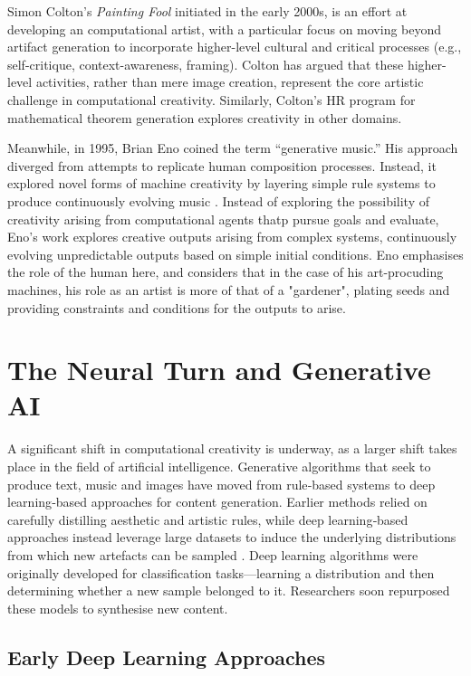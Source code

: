 Simon Colton’s \emph{Painting Fool} \cite{Colton2012-jc, Colton2015-qr} initiated in the early 2000s, is an effort at developing an computational artist, with a particular focus on moving beyond artifact generation to incorporate higher-level cultural and critical processes (e.g., self-critique, context-awareness, framing). Colton has argued that these higher-level activities, rather than mere image creation, represent the core artistic challenge in computational creativity. Similarly, Colton’s HR program for mathematical theorem generation \cite{Colton2002-nx} explores creativity in other domains.

Meanwhile, in 1995, Brian Eno coined the term “generative music.” His approach diverged from attempts to replicate human composition processes. Instead, it explored novel forms of machine creativity by layering simple rule systems to produce continuously evolving music \cite{Eno2020-ip, Brian1996-tj}. Instead of exploring the possibility of creativity arising from computational agents thatp pursue goals and evaluate, Eno's work explores creative outputs arising from complex systems, continuously evolving unpredictable outputs based on simple initial conditions. Eno emphasises the role of the human here, and considers that in the case of his art-procuding machines, his role as an artist is more of that of a "gardener", plating seeds and providing constraints and conditions for the outputs to arise.

\section{The Neural Turn and Generative AI}

A significant shift in computational creativity is underway, as a larger shift takes place in the field of artificial intelligence. Generative algorithms that seek to produce text, music and images have moved from rule‑based systems to deep learning‑based approaches for content generation. Earlier methods relied on carefully distilling aesthetic and artistic rules, while deep learning‑based approaches instead leverage large datasets to induce the underlying distributions from which new artefacts can be sampled \cite{Goodfellow2016-su, M2023-ia, LeCun2015-cv}. Deep learning algorithms were originally developed for classification tasks—learning a distribution and then determining whether a new sample belonged to it. Researchers soon repurposed these models to synthesise new content.

\subsection{Early Deep Learning Approaches}

